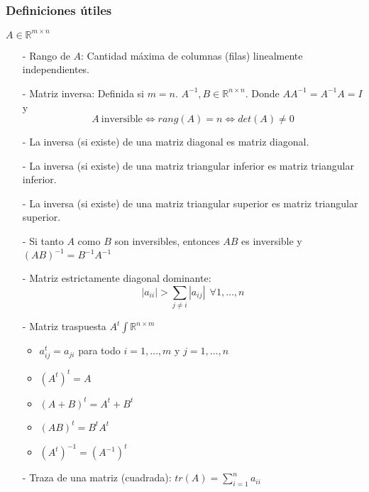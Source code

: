 \subsubsection{Definiciones útiles}
\label{subsubsec:definiciones_utiles_matrices}

$A \in \mathbb{R}^{m \times n}$

\begin{itemize}
    \item[-] Rango de $A$: Cantidad máxima de columnas (filas) linealmente independientes.
    \item[-] Matriz inversa: Definida si $m = n$. $A^{-1}, B \in \mathbb{R}^{n \times n}$. Donde $AA^{-1} = A^{-1}A = I$ y 
     \[A ~\text{inversible} \iff rang(A) = n \iff det(A) \neq 0\]
    \item[-] La inversa (si existe) de una matriz diagonal es matriz diagonal.
    \item[-] La inversa (si existe) de una matriz triangular inferior es matriz triangular inferior.
    \item[-] La inversa (si existe) de una matriz triangular superior es matriz triangular superior.
    \item[-] Si tanto $A$ como  $B$ son inversibles, entonces $AB$ es inversible y ${(AB)}^{-1} = B^{-1}A^{-1}$
    \item[-] Matriz estrictamente diagonal dominante:
    \[|a_{ii}| >  \sum_{j\neq i}|a_{ij}| ~~\forall 1,\ldots,n\]
    \item[-] Matriz traspuesta $A^{t} \int \mathbb{R}^{n \times m}$
    \begin{itemize}
        \item $a_{ij}^{t} = a_{ji}$ para todo $i = 1,\ldots,m$ y $j = 1,\ldots,n$
        \item ${(A^{t})}^{t} = A$
        \item ${(A + B)}^{t} = A^{t} + B^{t}$
        \item ${(AB)}^{t} = B^{t}A^{t}$
        \item $(A^{t})^{-1} = {(A^{-1})}^{t}$
    \end{itemize}
    \item[-] Traza de una matriz (cuadrada): $tr(A) = \sum_{i=1}^{n} a_{ii}$
    

\end{itemize}
